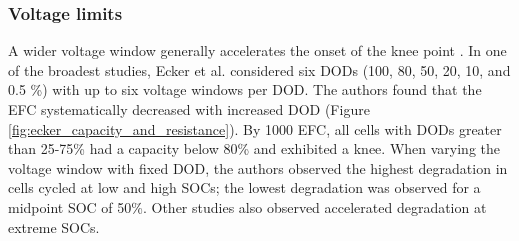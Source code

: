 \documentclass[journal=jpclcd,manuscript=article]{achemso}
\begin{document}
\subsubsection{Voltage limits} 
A wider voltage window generally accelerates the onset of the knee point \cite{ecker_calendar_2014, pfrang_long-term_2018, klett_non-uniform_2014, ma_novel_2019, petzl_lithium_2015, schuster_nonlinear_2015}. In one of the broadest studies, Ecker et al. \cite{ecker_calendar_2014} considered six DODs (100, 80, 50, 20, 10, and 0.5 \%) with up to six voltage windows per DOD. The authors found that the EFC systematically decreased with increased DOD (Figure \ref{fig:ecker_capacity_and_resistance}). By 1000 EFC, all cells with DODs greater than 25-75\% had a capacity below 80\% and exhibited a knee. When varying the voltage window with fixed DOD, the authors observed the highest degradation in cells cycled at low and high SOCs; the lowest degradation was observed for a midpoint SOC of 50\%. Other studies also observed accelerated degradation at extreme SOCs. \cite{aiken_accelerated_2020,ma_novel_2019, zhu_investigation_2021}
\end{document}
